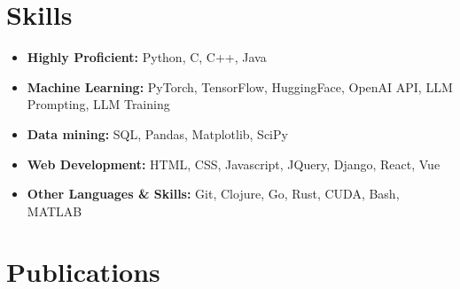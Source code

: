 \documentclass[11pt]{article}
\begin{document}

\section{Skills}

\begin{itemize}
    \item \textbf{Highly Proficient:} Python, C, C++, Java
    \item \textbf{Machine Learning:} PyTorch, TensorFlow, HuggingFace, OpenAI API, LLM Prompting, LLM Training
    \item \textbf{Data mining:} SQL, Pandas, Matplotlib, SciPy
    \item \textbf{Web Development:} HTML, CSS, Javascript, JQuery, Django, React, Vue
    \item \textbf{Other Languages \& Skills:} Git, Clojure, Go, Rust, CUDA, Bash, MATLAB
\end{itemize}


\section{Publications}
\end{document}
